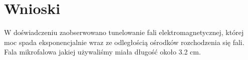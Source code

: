 \documentclass[a4paper,12pt]{article}
\begin{document}
\section{Wnioski}



W doświadczeniu zaobserwowano tunelowanie fali elektromagnetycznej, której moc spada eksponencjalnie wraz ze odległością ośrodków rozchodzenia się fali. 
Fala mikrofalowa jakiej używaliśmy miała długość około 	3.2 cm.


  
\end{document}
